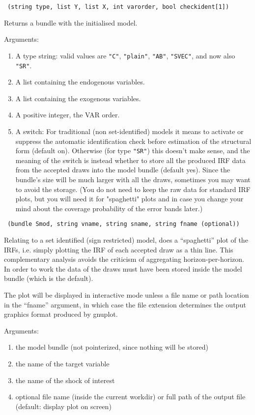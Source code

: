\documentclass[a4paper,10pt]{article}
\newenvironment{funcdoc}[1]
{\noindent\hrulefill\newline\nopagebreak\texttt{#1}%
\nopagebreak\par\noindent\hrulefill%
\nopagebreak\par\nopagebreak\smallskip\nopagebreak\par}
{\bigskip}
\begin{document}
\begin{funcdoc}{ (string type, list Y, list X, int varorder, 
  bool checkident[1])}
  \noindent Returns a bundle with the initialised model. 
  
  \noindent Arguments:
  \begin{enumerate}
  \item A type string: valid values are \texttt{"C"},
    \texttt{"plain"}, \texttt{"AB"}, \texttt{"SVEC"}, and now also \texttt{"SR"}.
  \item A list containing the endogenous variables.
  \item A list containing the exogenous variables.
  \item A positive integer, the VAR order.
  \item A switch: For traditional (non set-identified) models it means to activate or suppress 
   the automatic identification check before estimation of the structural form (default on). 
   Otherwise (for type \texttt{"SR"}) this doesn't make sense, and the meaning of the switch
   is instead whether to store all the produced IRF data from the accepted draws into the 
   model bundle (default yes). Since the bundle's size will be much larger with all the draws,
   sometimes you may want to avoid the storage. (You do not need to keep the raw data for 
   standard IRF plots, but you will need it for "spaghetti" plots and in case you change your 
   mind about the coverage probability of the error bands later.)
  \end{enumerate}
\end{funcdoc}

\begin{funcdoc}{ (bundle Smod, string vname, string sname, 
 string fname (optional))}
 \noindent Relating to a set identified (sign restricted) model, does a 
  ``spaghetti'' plot of the IRFs, i.e. simply plotting the IRF of each accepted
  draw as a thin line. This complementary analysis avoids the criticism of 
  aggregating horizon-per-horizon. 
 In order to work the data of the draws must have been stored inside the model
  bundle (which is the default).

  The plot will be displayed in interactive mode unless a file name or path
  location in the ``fname'' argument, in which case the file extension determines
  the output graphics format produced by gnuplot.
 
 \noindent Arguments:
 \begin{enumerate}
  \item the model bundle (not pointerized, since nothing will be stored)
  \item the name of the target variable
  \item the name of the shock of interest
  \item optional file name (inside the current workdir) or full path of the output file 
   (default: display plot on screen)
 \end{enumerate}


\end{funcdoc}
\end{document}
